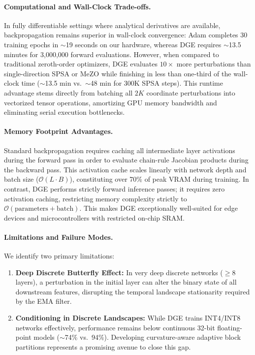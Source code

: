 \documentclass[11pt,a4paper]{article}
\begin{document}
\paragraph{Computational and Wall-Clock Trade-offs.}
In fully differentiable settings where analytical derivatives are available, backpropagation remains superior in wall-clock convergence: Adam completes 30 training epochs in $\sim$19 seconds on our hardware, whereas DGE requires $\sim$13.5 minutes for 3,000,000 forward evaluations. However, when compared to traditional zeroth-order optimizers, DGE evaluates $10\times$ more perturbations than single-direction SPSA or MeZO while finishing in less than one-third of the wall-clock time ($\sim$13.5 min vs.\ $\sim$48 min for 300K SPSA steps). This runtime advantage stems directly from batching all $2K$ coordinate perturbations into vectorized tensor operations, amortizing GPU memory bandwidth and eliminating serial execution bottlenecks.

\paragraph{Memory Footprint Advantages.}
Standard backpropagation requires caching all intermediate layer activations during the forward pass in order to evaluate chain-rule Jacobian products during the backward pass. This activation cache scales linearly with network depth and batch size ($\mathcal{O}(L \cdot B)$), constituting over 70\% of peak VRAM during training. In contrast, DGE performs strictly forward inference passes; it requires zero activation caching, restricting memory complexity strictly to $\mathcal{O}(\text{parameters} + \text{batch})$. This makes DGE exceptionally well-suited for edge devices and microcontrollers with restricted on-chip SRAM.

\paragraph{Limitations and Failure Modes.}
We identify two primary limitations:
\begin{enumerate}
    \item \textbf{Deep Discrete Butterfly Effect:} In very deep discrete networks ($\ge 8$ layers), a perturbation in the initial layer can alter the binary state of all downstream features, disrupting the temporal landscape stationarity required by the EMA filter.
    \item \textbf{Conditioning in Discrete Landscapes:} While DGE trains INT4/INT8 networks effectively, performance remains below continuous 32-bit floating-point models ($\sim$74\% vs.\ 94\%). Developing curvature-aware adaptive block partitions represents a promising avenue to close this gap.
\end{enumerate}
\end{document}

